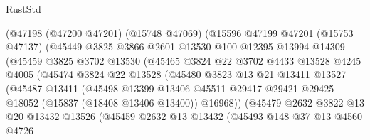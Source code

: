 \begin{lexlean}{RustStd}
\begin{coremodule}
                    (@47198
                      (@47200 @47201)
                      (@15748 @47069)
                      (@15596
                        @47199
                        @47201
                        (@15753 @47137)
                        (@45449
                          @3825
                          @3866
                          @2601
                          @13530
                          @100
                          @12395
                          @13994
                          @14309
                          (@45459
                            @3825
                            @3702
                            @13530
                            (@45465
                              @3824
                              @22
                              @3702
                              @4433
                              @13528
                              @4245
                              @4005
                              (@45474
                                @3824
                                @22
                                @13528
                                (@45480
                                  @3823
                                  @13
                                  @21
                                  @13411
                                  @13527
                                  (@45487
                                    @13411
                                    (@45498
                                      @13399
                                      @13406
                                      @45511
                                      @29417
                                      @29421
                                      @29425
                                      @18052
                                      (@15837 (@18408 @13406 @13400))
                                      @16968))
                                  (@45479
                                    @2632
                                    @3822
                                    @13
                                    @20
                                    @13432
                                    @13526
                                    (@45459
                                      @2632
                                      @13
                                      @13432
                                      (@45493
                                        @148
                                        @37
                                        @13
                                        @4560
                                        @4726

\end{coremodule}
\end{lexlean}
